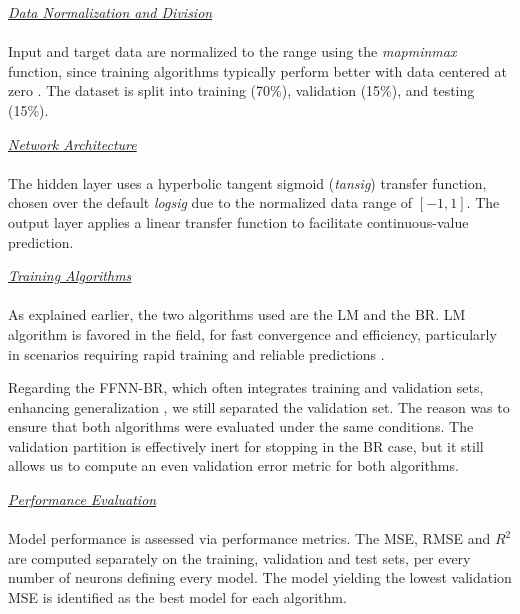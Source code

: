 \documentclass[10pt]{article}
\begin{document}
	\newpage
	
		\underline{\textit{Data Normalization and Division}} \\
		\\
		Input and target data are normalized to the range  using the \textit{mapminmax} function, since training algorithms typically perform better with data centered at zero \cite{guzman2017,taherdangkoo2020}. The dataset is split into training (70\%), validation (15\%), and testing (15\%).
		
		\underline{\textit{Network Architecture}} \\
		\\
		The hidden layer uses a hyperbolic tangent sigmoid (\textit{tansig}) \cite{matlab-tansig} transfer function, chosen over the default \textit{logsig} \cite{matlab-logsig} due to the normalized data range of \([-1, 1]\). The output layer applies a linear transfer function to facilitate continuous-value prediction.
		
		\underline{\textit{Training Algorithms}} \\
		\\
		As explained earlier, the two algorithms used are the LM and the BR. LM algorithm is favored in the field, for fast convergence and efficiency, particularly in scenarios requiring rapid training and reliable predictions \cite{taherdangkoo2020}.
		
		Regarding the FFNN-BR, which often integrates training and validation sets, enhancing generalization \cite{guzman2017,taherdangkoo2020,foresee1997}, we still separated the validation set. The reason was to ensure that both algorithms were evaluated under the same conditions. The validation partition is effectively inert for stopping in the BR case, but it still allows us to compute an even validation error metric for both algorithms.
		
		\newpage
		
		
		\underline{\textit{Performance Evaluation}} \\
		\\
		Model performance is assessed via performance metrics. The MSE, RMSE and $R^{2}$ are computed separately on the training, validation and test sets, per every number of neurons defining every model. The model yielding the lowest validation MSE is identified as the best model for each algorithm.
		
\end{document}

